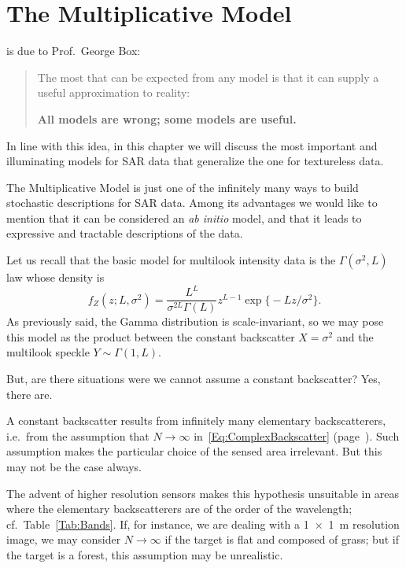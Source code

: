 \chapter{The Multiplicative Model}\label{Chapter:MultiplicativeModel}

 is due to Prof.\ George Box\cite{StatisticsForExperimenters}:
\begin{quotation}
The most that can be expected from any model is that it can supply a useful approximation to reality:

\textbf{All models are wrong; some models are useful.}
\end{quotation}
In line with this idea, in this chapter we will discuss the most important and illuminating models for SAR data that generalize the one for textureless data.

The Multiplicative Model is just one of the infinitely many ways to build stochastic descriptions for SAR data.
Among its advantages we would like to mention that it can be considered an \textit{ab initio} model, and that it leads to expressive and tractable descriptions of the data.

Let us recall that the basic model for multilook intensity data is the $\Gamma(\sigma^2,L)$ law whose density is
\begin{equation}
f_Z(z;L,\sigma^2) = \frac{L^L}{\sigma^{2L}\Gamma(L)} z^{L-1} 
	\exp\big\{ -L z / \sigma^2
	\big\}.
\end{equation}
As previously said, the Gamma distribution is scale-invariant, so we may pose this model as the product between the constant backscatter $X=\sigma^2$ and the multilook speckle $Y\sim\Gamma(1,L)$.

But, are there situations were we cannot assume a constant backscatter?
Yes, there are.

A constant backscatter results from infinitely many elementary backscatterers, i.e.\ from the assumption that $N\to\infty$ in~\eqref{Eq:ComplexBackscatter} (page~\pageref{Eq:ComplexBackscatter}).
Such assumption makes the particular choice of the sensed area irrelevant.
But this may not be the case always.

The advent of higher resolution sensors makes this hypothesis unsuitable in areas where the elementary backscatterers are of the order of the wavelength; cf.\ Table~\ref{Tab:Bands}.
If, for instance, we are dealing with a \SI{1x1}{\meter} resolution image, we may consider $N\to\infty$ if the target is flat and composed of grass;
but if the target is a forest, this assumption may be unrealistic.


